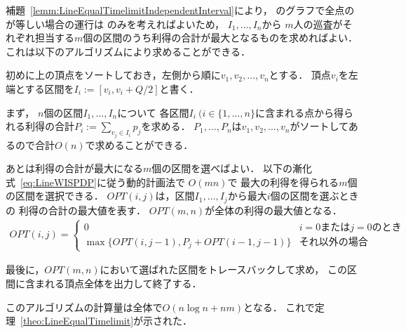 補題~\ref{lemm:LineEqualTimelimitIndependentInterval}により，
{\graphLine}のグラフで全点の{\maxIdletime}が等しい場合の運行は
{\indSectOperation}のみを考えればよいため，
$I_1, \ldots, I_n$から
$m$人の巡査がそれぞれ担当する$m$個の区間のうち利得の合計が最大となるものを求めればよい．
これは以下のアルゴリズムにより求めることができる．

初めに{\graphLine}上の頂点をソートしておき，左側から順に$v_1, v_2, \ldots, v_n$とする．
頂点$v_i$を左端とする区間を$I_i := [v_i, v_i + Q/2]$と書く．

まず，
$n$個の区間$I_1, \ldots, I_n$について
各区間$I_i\ (i \in \{ 1, \ldots, n \}$に含まれる点から得られる利得の合計$P_i := \sum_{v_j \in I_i} p_j$を求める．
$P_1, \ldots, P_n$は$v_1, v_2, \ldots, v_n$がソートしてあるので合計$O(n)$で求めることができる．

あとは利得の合計が最大になる$m$個の区間を選べばよい．
以下の漸化式~\eqref{eq:LineWISPDP}に従う動的計画法で
$O(mn)$で
最大の利得を得られる$m$個の区間を選択できる．
$OPT(i,j)$は，区間$I_1, \ldots, I_j$から最大$i$個の区間を選ぶときの
利得の合計の最大値を表す．
$OPT(m,n)$が全体の利得の最大値となる．
\begin{align}
  \label{eq:LineWISPDP}
  OPT(i,j) = 
  \begin{cases}
    0 & \text{$i = 0$または$j = 0$のとき} \\
    \max \{
      OPT(i, j - 1), 
      P_j + OPT(i - 1, j - 1)
    \}
    & \text{それ以外の場合}
  \end{cases}
\end{align}

最後に，$OPT(m,n)$において選ばれた区間をトレースバックして求め，
この区間に含まれる頂点全体を出力して終了する．

このアルゴリズムの計算量は全体で$O(n \log n + nm)$となる．
これで定理~\ref{theo:LineEqualTimelimit}が示された．


